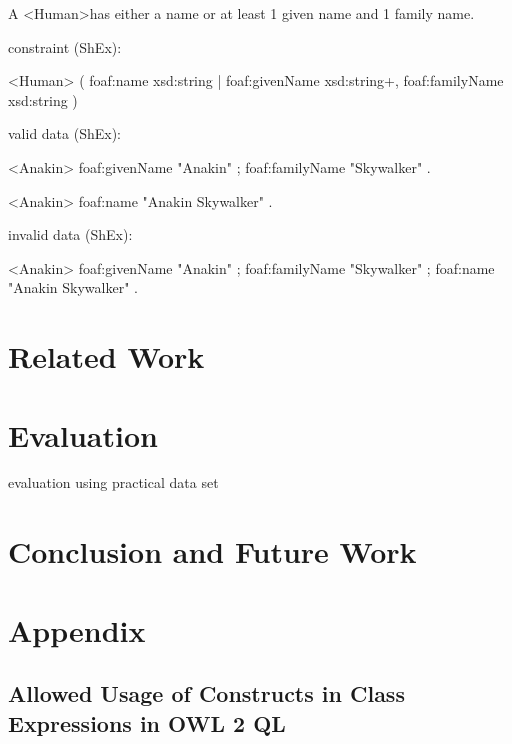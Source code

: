 \documentclass{llncs}
\begin{document}
A \textless Human\textgreater has either a name or at least 1 given name and 1 family name.

constraint (ShEx):

\begin{ex}
<Human> {                           
    (                                    
            foaf:name xsd:string              
        |                                   
            foaf:givenName xsd:string+,      
            foaf:familyName xsd:string
    )
}
\end{ex}

valid data (ShEx):

\begin{ex}
<Anakin>
    foaf:givenName "Anakin" ;
    foaf:familyName "Skywalker" .
\end{ex}

\begin{ex}
<Anakin>
    foaf:name "Anakin Skywalker" .
\end{ex}

invalid data (ShEx):

\begin{ex}
<Anakin>
    foaf:givenName "Anakin" ;
    foaf:familyName "Skywalker" ;
    foaf:name "Anakin Skywalker" .
\end{ex}

\section{Related Work}



\section{Evaluation}

evaluation using practical data set

\section{Conclusion and Future Work}

\section{Appendix}


\subsection{Allowed Usage of Constructs in Class Expressions in OWL 2 QL}
\end{document}
